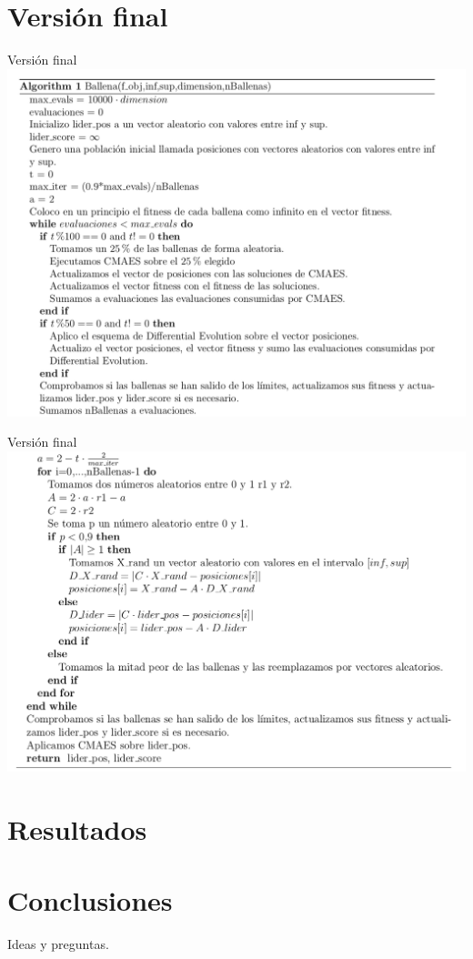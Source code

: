 \documentclass[10pt]{beamer}
\begin{document}
\section{Versión final}

	\begin{frame}[fragile]{Versión final}
		\includegraphics[scale=0.25]{./Imagenes/version_final_p1.png}
	\end{frame}

	\begin{frame}[fragile]{Versión final}
		\includegraphics[scale=0.25]{./Imagenes/version_final_p2.png}
	\end{frame}

\section{Resultados}

\section{Conclusiones}



\begin{frame}[standout]
	\huge Ideas y preguntas.
\end{frame}
\end{document}
